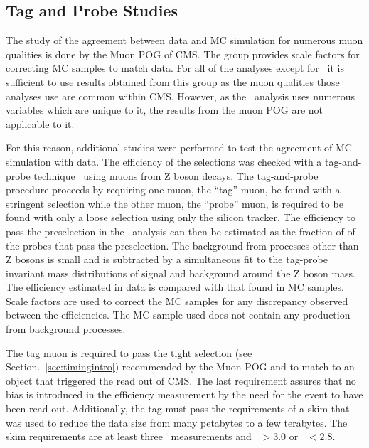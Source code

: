 \subsection{Tag and Probe Studies \label{sec:TagProbe}}
The study of the agreement between data and MC simulation for numerous muon qualities is done by the Muon POG of CMS.
The group provides scale factors for correcting MC samples to match data.
For all of the analyses except for \muononly\  it is sufficient to use results obtained from this group as the muon qualities
those analyses use are common within CMS.
However, as the \muononly\ analysis uses numerous variables which are unique to it, the results from the muon POG are not applicable to it.

For this reason, additional studies were performed to test the agreement of MC simulation with data.
The efficiency of the selections was checked with a tag-and-probe technique~\cite{2012JInst...7P0002T} using muons from Z boson decays.
The tag-and-probe procedure proceeds by requiring one muon, the ``tag'' muon, be found with a stringent selection while the other muon, the ``probe'' muon,
is required to be found with only a loose selection using only the silicon tracker. The efficiency to pass the preselection in the \muononly\ analysis
can then be estimated as the fraction of of the probes that pass the preselection. The background from processes other than Z bosons is small and is subtracted by
a simultaneous fit to the tag-probe invariant mass distributions of signal and background around the Z boson mass.
The efficiency estimated in data is compared with that found in MC samples. Scale factors are used to correct the MC samples for any discrepancy observed between the efficiencies.
The MC sample used does not contain any production from background processes.

The tag muon is required to pass the tight selection (see Section.~\ref{sec:timingintro}) recommended by the Muon POG and to match to an object that triggered the read out of CMS. 
The last requirement assures that no bias is introduced in the efficiency measurement by the need for the event to have been read out.
Additionally, the tag must pass the requirements of a skim that was used to reduce the data size from many petabytes
to a few terabytes. The skim requirements are at least three \dedx\ measurements and \ih\ $> 3.0$ or \ih\ $< 2.8$.

